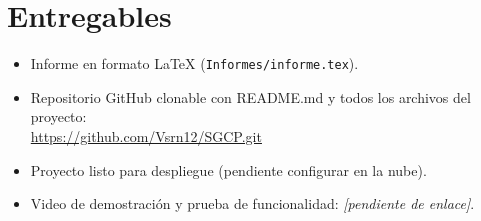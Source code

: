\documentclass[12pt,a4paper]{article}
\begin{document}
\section{Entregables}

\begin{itemize}
    \item Informe en formato \LaTeX{} (\texttt{Informes/informe.tex}).
    \item Repositorio GitHub clonable con README.md y todos los archivos del proyecto:\\
          \url{https://github.com/Vsrn12/SGCP.git}
    \item Proyecto listo para despliegue (pendiente configurar en la nube).
    \item Video de demostración y prueba de funcionalidad: \textit{[pendiente de enlace]}.
\end{itemize}
\end{document}
